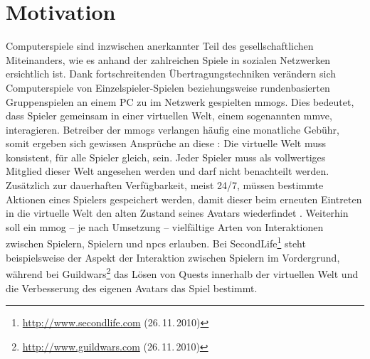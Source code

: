 \chapter{Motivation}
\label{chap:einleitung}
Computerspiele sind inzwischen anerkannter Teil des gesellschaftlichen Miteinanders, wie es anhand der zahlreichen Spiele in sozialen Netzwerken ersichtlich ist. Dank fortschreitenden Übertragungs\-techniken verändern sich Computerspiele von Einzelspieler-Spielen beziehungsweise rundenbasierten Gruppenspielen an einem PC zu im Netzwerk gespielten \acp{mmog}. Dies bedeutet, dass Spieler gemeinsam in einer virtuellen Welt, einem sogenannten \ac{mmve}, interagieren. Betreiber der \acp{mmog} verlangen häufig eine monatliche Gebühr, somit ergeben sich gewissen Ansprüche an diese \cite{Fischer2010a}: Die virtuelle Welt muss konsistent, für alle Spieler gleich, sein. Jeder Spieler muss als vollwertiges Mitglied dieser Welt angesehen werden und darf nicht benachteilt werden. Zusätzlich zur dauerhaften Verfügbarkeit, meist 24/7, müssen bestimmte Aktionen eines Spielers gespeichert werden, damit dieser beim erneuten Eintreten in die virtuelle Welt den alten Zustand seines Avatars wiederfindet \cite{Zhang2008Persistence}. Weiterhin soll ein \ac{mmog} -- je nach Umsetzung -- vielfältige Arten von Interaktionen zwischen Spielern, Spielern und \acp{npc} erlauben. Bei SecondLife\footnote{\url{http://www.secondlife.com} (26.\,11.\,2010)} steht beispielsweise der Aspekt der Interaktion zwischen Spielern im Vordergrund, während bei Guildwars\footnote{\url{http://www.guildwars.com} (26.\,11.\,2010)} das Lösen von Quests innerhalb der virtuellen Welt und die Verbesserung des eigenen Avatars das Spiel bestimmt.

